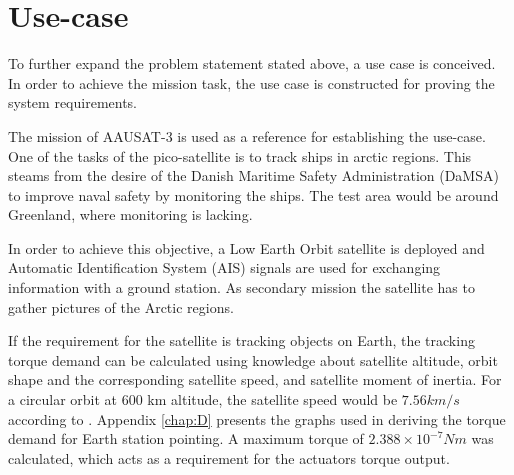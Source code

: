 
\section{Use-case}\label{sec:useCase}
To further expand the problem statement stated above, a use case is conceived. In order to achieve the mission task, the use case is constructed for proving the system requirements.

The mission of AAUSAT-3 is used as a reference for establishing the use-case. One of the tasks of the pico-satellite is to track ships in arctic regions. This steams from the desire of the Danish Maritime Safety Administration (DaMSA) to improve naval safety by monitoring the ships. The test area would be around Greenland, where monitoring is lacking. %

In order to achieve this objective, a Low Earth Orbit    satellite is deployed and Automatic Identification System (AIS) signals are used for exchanging information with a ground station. As secondary mission the satellite has to gather pictures of the Arctic regions.

If the requirement for the satellite is tracking objects on Earth, the tracking torque demand can be calculated using knowledge about satellite altitude, orbit shape and the corresponding satellite speed, and satellite moment of inertia. For a circular orbit at 600 km altitude, the satellite speed would be $7.56 km/s$  according to \cite{satSpeed}. Appendix \ref{chap:D} presents the graphs used in deriving the torque demand for Earth station pointing. A maximum torque of ${2.388 \times 10^{-7} Nm}$ was calculated, which acts as a requirement for the actuators torque output.